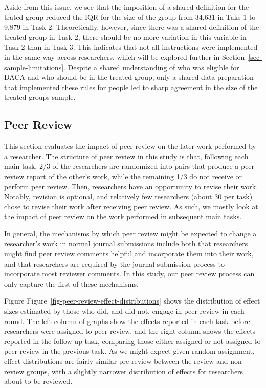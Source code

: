 \documentclass[
  letterpaper,
  DIV=11,
  numbers=noendperiod]{scrartcl}
\begin{document}
Aside from this issue, we see that the imposition of a shared definition
for the trated group reduced the IQR for the size of the group from
34,631 in Taks 1 to 9,879 in Task 2. Theoretically, however, since there
was a shared definition of the treated group in Task 2, there should be
no more variation in this variable in Task 2 than in Task 3. This
indicates that not all instructions were implemented in the same way
across researchers, which will be explored further in
Section~\ref{sec-sample-limitations}. Despite a shared understanding of
who was eligible for DACA and who should be in the treated group, only a
shared data preparation that implemented these rules for people led to
sharp agreement in the size of the treated-groups sample.

\hypertarget{peer-review}{%
\subsection{Peer Review}\label{peer-review}}

This section evaluates the impact of peer review on the later work
performed by a researcher. The structure of peer review in this study is
that, following each main task, 2/3 of the researchers are randomized
into pairs that produce a peer review report of the other's work, while
the remaining 1/3 do not receive or perform peer review. Then,
researchers have an opportunity to revise their work. Notably, revision
is optional, and relatively few researchers (about 30 per task) chose to
revise their work after receiving peer review. As such, we mostly look
at the impact of peer review on the work performed in subsequent main
tasks.

In general, the mechanisms by which peer review might be expected to
change a researcher's work in normal journal submissions include both
that researchers might find peer review comments helpful and incorporate
them into their work, and that researchers are required by the journal
submission process to incorporate most reviewer comments. In this study,
our peer review process can only capture the first of these mechanisms.

Figure Figure~\ref{fig-peer-review-effect-distributions} shows the
distribution of effect sizes estimated by those who did, and did not,
engage in peer review in each round. The left column of graphs show the
effects reported in each task before researchers were assigned to peer
review, and the right column shows the effects reported in the follow-up
task, comparing those either assigned or not assigned to peer review in
the previous task. As we might expect given random assignment, effect
distributions are fairly similar pre-review between the review and
non-review groups, with a slightly narrower distribution of effects for
researchers about to be reviewed.
\end{document}
